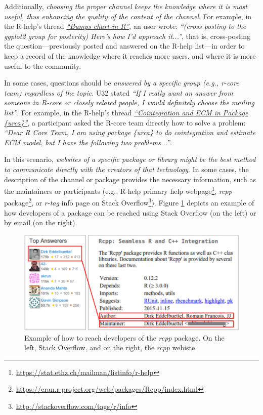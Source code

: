 \documentclass{sig-alternate-05-2015}
\begin{document}
		Additionally, \emph{choosing the proper channel keeps the knowledge where it is most useful, thus enhancing the quality of the content of the channel}.
		For example, in the R-help's thread \textit{\href{http://goo.gl/EJHWrs}{``Bumps chart in R''}}, an user wrote: \textit{``(cross posting to the ggplot2 group for posterity) Here's how I'd approach it...''}, that is, cross-posting the question---previously posted and answered on the R-help list---in order to keep a record of the knowledge where it reaches more users, and where it is more useful to the community.

		In some cases, questions should be \emph{answered by a \textit{specific group} (e.g., r-core team) regardless of the topic}.
		U32 stated \textit{``If I really want an answer from someone in R-core or closely related people, I would definitely choose the mailing list''}.
		For example, in the R-help's thread \textit{\href{http://goo.gl/7olLv7}{``Cointegration and ECM in Package \{urca\}''}}, a participant asked the R-core team directly how to solve a problem: \textit{``Dear R Core Team, I am using package \{urca\} to do cointegration and estimate ECM model, but I have the following two problems...''}.

		In this scenario, \emph{websites of a specific package or library might be the best method to communicate directly with the creators of that technology}.
		In some cases, the description of the channel or package provides the necessary information, such as the maintainers or participants (e.g., R-help primary help webpage\footnote{\url{https://stat.ethz.ch/mailman/listinfo/r-help}}, \emph{rcpp} package\footnote{\url{https://cran.r-project.org/web/packages/Rcpp/index.html}}, or \textit{r-tag} info page on Stack Overflow\footnote{\url{http://stackoverflow.com/tags/r/info}}).
		Figure \ref{fig:CCchannel} depicts an example of how developers of a package can be reached using Stack Overflow (on the left) or by email (on the right). 

		\begin{figure} [!htb]
			\centering
			\includegraphics[width=\columnwidth]{Figures/CCchannel}
			\caption{Example of how to reach developers of the \emph{rcpp} package. On the left, Stack Overflow, and on the right, the \emph{rcpp} webiste.}
			\label{fig:CCchannel}
		\end{figure}
\end{document}
